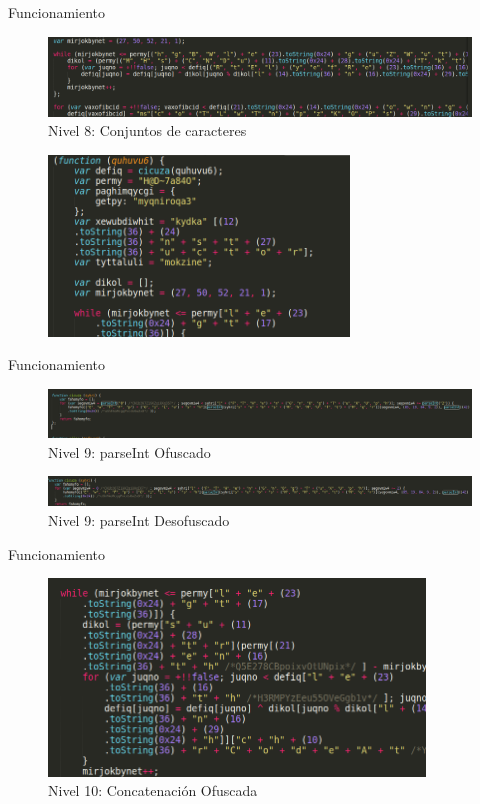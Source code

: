 \documentclass[aspectratio=169]{beamer}
\begin{document}
  	\begin{frame}{Funcionamiento}
	\begin{figure}[H]
		\centering
		\includegraphics[width=12cm]{images/level8.png}
		\caption{Nivel 8: Conjuntos de caracteres} 
	\end{figure}
	
	\begin{figure}[H]
		\centering
		\includegraphics[width=8cm]{images/level8_after.png}
	\end{figure}
  	\end{frame}
  	\begin{frame}{Funcionamiento}
	\begin{figure}[H]
		\centering
		\includegraphics[width=15cm]{images/level9.png}
		\caption{Nivel 9: parseInt Ofuscado} 
	\end{figure}
	
	\begin{figure}[H]
		\centering
		\includegraphics[width=15cm]{images/level9_after.png}
		\caption{Nivel 9: parseInt Desofuscado} 
	\end{figure}
  	\end{frame}
  	\begin{frame}{Funcionamiento}
	\begin{figure}[H]
		\centering
		\includegraphics[width=10cm]{images/level10.png}
		\caption{Nivel 10: Concatenación Ofuscada} 
	\end{figure}
	
  	\end{frame}
\end{document}
